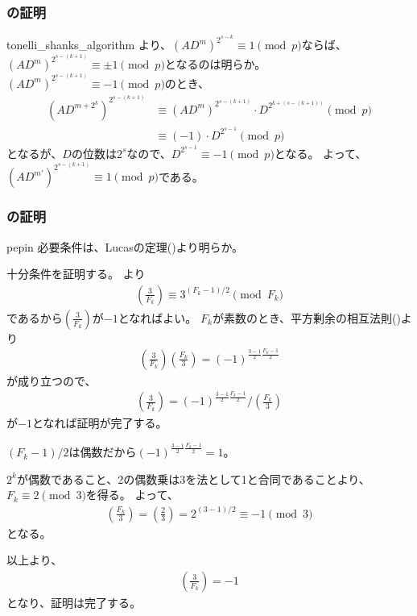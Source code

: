 \subsubsection{の証明}
\begin{prProof}{tonelli_shanks_algorithm}
より、$(AD^m)^{2^{s-k}}\equiv1\pmod{p}$ならば、$(AD^m)^{2^{s-(k+1)}}\equiv\pm1\pmod{p}$となるのは明らか。
$(AD^m)^{2^{s-(k+1)}}\equiv-1\pmod{p}$のとき、
\begin{align*}
(AD^{m + 2^k})^{2^{s-(k+1)}} &\equiv (AD^m)^{2^{s-(k+1)}}\cdot D^{2^{k+(s-(k+1))}}\pmod{p}\\
&\equiv (-1)\cdot D^{2^{s-1}}\pmod{p}
\end{align*}
となるが、$D$の位数は$2^s$なので、$D^{2^{s-1}}\equiv-1\pmod{p}$となる。
よって、$(AD^{m'})^{2^{s-(k+1)}}\equiv1\pmod{p}$である。
\end{prProof}

\subsubsection{の証明}
\begin{thProof}{pepin}
必要条件は、Lucasの定理()より明らか。

十分条件を証明する。
より
\begin{align*}
\left(\frac{3}{F_k}\right) \equiv 3^{(F_k-1)/2} \pmod{F_k}
\end{align*}
であるから$\left(\frac{3}{F_k}\right)$が$-1$となればよい。
$F_k$が素数のとき、平方剰余の相互法則()より
\begin{align*}
\left(\frac{3}{F_k}\right)\left(\frac{F_k}{3}\right) = (-1)^{\frac{3-1}{2}\frac{F_k-1}{2}}
\end{align*}
が成り立つので、
\begin{align*}
\left(\frac{3}{F_k}\right) = (-1)^{\frac{3-1}{2}\frac{F_k-1}{2}} \bigg/ \left(\frac{F_k}{3}\right)
\end{align*}
が$-1$となれば証明が完了する。

$(F_k-1)/2$は偶数だから$(-1)^{\frac{3-1}{2}\frac{F_k-1}{2}}=1$。

$2^k$が偶数であること、2の偶数乗は3を法として1と合同であることより、$F_k\equiv2\pmod{3}$を得る。
よって、
\begin{align*}
\left(\frac{F_k}{3}\right) = \left(\frac{2}{3}\right) = 2^{(3-1)/2} \equiv -1 \pmod{3}
\end{align*}
となる。

以上より、
\begin{align*}
\left(\frac{3}{F_k}\right) = -1
\end{align*}
となり、証明は完了する。
\end{thProof}
